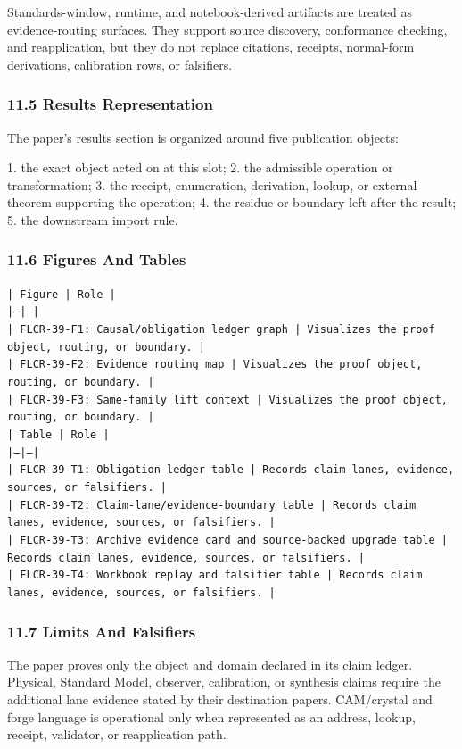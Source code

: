 \documentclass[11pt]{article}
\begin{document}
Standards-window, runtime, and notebook-derived artifacts are treated
as evidence-routing surfaces. They support source discovery, conformance
checking, and reapplication, but they do not replace citations, receipts,
normal-form derivations, calibration rows, or falsifiers.

\subsubsection*{11.5 Results Representation}

The paper's results section is organized around five publication objects:

1. the exact object acted on at this slot;
2. the admissible operation or transformation;
3. the receipt, enumeration, derivation, lookup, or external theorem supporting
   the operation;
4. the residue or boundary left after the result;
5. the downstream import rule.

\subsubsection*{11.6 Figures And Tables}

\noindent\texttt{| Figure | Role |}\\
\noindent\texttt{|---|---|}\\
\noindent\texttt{| FLCR-39-F1: Causal/obligation ledger graph | Visualizes the proof object, routing, or boundary. |}\\
\noindent\texttt{| FLCR-39-F2: Evidence routing map | Visualizes the proof object, routing, or boundary. |}\\
\noindent\texttt{| FLCR-39-F3: Same-family lift context | Visualizes the proof object, routing, or boundary. |}\\

\noindent\texttt{| Table | Role |}\\
\noindent\texttt{|---|---|}\\
\noindent\texttt{| FLCR-39-T1: Obligation ledger table | Records claim lanes, evidence, sources, or falsifiers. |}\\
\noindent\texttt{| FLCR-39-T2: Claim-lane/evidence-boundary table | Records claim lanes, evidence, sources, or falsifiers. |}\\
\noindent\texttt{| FLCR-39-T3: Archive evidence card and source-backed upgrade table | Records claim lanes, evidence, sources, or falsifiers. |}\\
\noindent\texttt{| FLCR-39-T4: Workbook replay and falsifier table | Records claim lanes, evidence, sources, or falsifiers. |}\\

\subsubsection*{11.7 Limits And Falsifiers}

The paper proves only the object and domain declared in its claim ledger.
Physical, Standard Model, observer, calibration, or synthesis claims require
the additional lane evidence stated by their destination papers. CAM/crystal
and forge language is operational only when represented as an address, lookup,
receipt, validator, or reapplication path.
\end{document}
